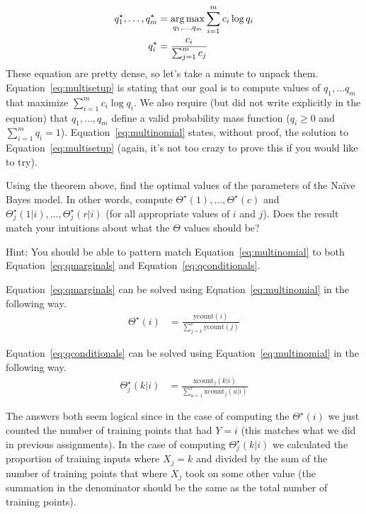 \documentclass[assignment04_Solutions]{subfiles}
\begin{document}
\begin{exercise}[(60 minutes)]
\begin{align}
q^\star_1, \ldots, q^\star_m &= \operatorname*{arg\,max}_{q_1, \ldots, q_m} \sum_{i=1}^m c_i \log q_i \label{eq:multisetup} \\
q^\star_i &= \frac{c_i}{\sum_{j=1}^m c_j} \label{eq:multinomial}
\end{align}
These equation are pretty dense, so let's take a minute to unpack them.  Equation~\ref{eq:multisetup} is stating that our goal is to compute values of $q_1, \ldots q_m$ that maximize $\sum_{i=1}^m c_i \log q_i$.  We also require (but did not write explicitly in the equation) that $q_1, \ldots, q_m$ define a valid probability mass function ($q_i \geq 0$ and $\sum_{i=1}^m q_i = 1$).  Equation~\ref{eq:multinomial} states, without proof, the solution to Equation~\ref{eq:multisetup} (again, it's not too crazy to prove this if you would like to try).

Using the theorem above, find the optimal values of the parameters of the Na\"ive Bayes model.  In other words, compute $\Theta^\star(1), \ldots, \Theta^\star(c)$ and $\Theta_j^\star(1|i), \ldots, \Theta^\star_j(r|i)$ (for all appropriate values of $i$ and $j$).  Does the result match your intuitions about what the $\Theta$ values should be?

Hint: You should be able to pattern match Equation~\ref{eq:multinomial} to both Equation~\ref{eq:qmarginals} and Equation~\ref{eq:qconditionals}. 

\begin{boxedsolution}
Equation~\ref{eq:qmarginals} can be solved using Equation~\ref{eq:multinomial} in the following way.
\begin{align}
\Theta^\star(i) &= \frac{\mbox{ycount}(i)}{\sum_{j=1}^c \mbox{ycount}(j)}
\end{align}

Equation~\ref{eq:qconditionals} can be solved using Equation~\ref{eq:multinomial} in the following way.
\begin{align}
\Theta_j^\star(k|i) &= \frac{\mbox{xcount}_j(k|i)}{\sum_{u=1}^r \mbox{xcount}_j(u|i)}
\end{align}

The answers both seem logical since in the case of computing the $\Theta^\star(i)$ we just counted the number of training points that had $Y=i$ (this matches what we did in previous assignments).  In the case of computing $\Theta^\star_j(k|i)$ we calculated the proportion of training inputs where $X_j = k$ and divided by the sum of the number of training points that where $X_j$ took on some other value (the summation in the denominator should be the same as the total number of training points).
\end{boxedsolution}
\ees
\end{exercise}

\end{document}
